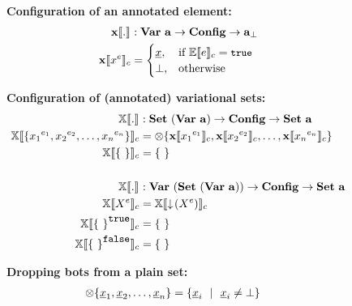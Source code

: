 \begin{figure}
%
\textbf{Configuration of an annotated element:}
\begin{alignat*}{1}
\xeSem [] . &: \elemSet \to \confSet \to \maybe \pelemSet\\
\xeSem {\annot \elem} &=
  \begin{cases}
    \pElem, & \If \fSem {\dimMeta} = \t\\
    \bot, &\Otherwise    
  \end{cases}
\end{alignat*}

\medskip
\textbf{Configuration of (annotated) variational sets:}
\begin{alignat*}{1}
\osetSem [] . &: \vsetSet \to \confSet \to \psetSet\\
\osetSem {\setDef{\annot [\dimMeta_1] {\elem_1}, \annot [\dimMeta_2] {\elem_2}, \ldots, \annot [\dimMeta_n] {\elem_n}}} &= \dropbot {\setDef{\xeSem {\annot [\dimMeta_1] {\elem_1}}, 
\xeSem {\annot [\dimMeta_2] {\elem_2}}, \ldots, \xeSem {\annot [\dimMeta_n] {\elem_n}} }}\\
\osetSem {\setDef \ } &= \setDef \ \\
%
&\\
%
\osetSem [] . &: \annotvsetSet \to \confSet \to \psetSet\\
\osetSem {\annot {\vset}} &= \osetSem {\pushIn {\annot \vset}}\\
\osetSem {\annot [\t] {\setDef \ }} & = \setDef \ \\
\osetSem {\annot [\f] {\setDef \ }} & = \setDef \ 
\end{alignat*}

\medskip
\textbf{Dropping bots from a plain set:}
\begin{alignat*}{1}
\dropbot {\setDef {\pElem_1, \pElem_2, \ldots, \pElem_n}} &= \setDef {\pElem_i \myOR \pElem_i \neq \bot}
\end{alignat*}


\end{figure}
